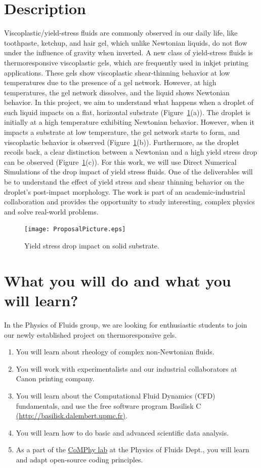 \documentclass[11pt]{article}
\begin{document}
\section*{Description}
Viscoplastic/yield-stress fluids are commonly observed in our daily life, like toothpaste, ketchup, and hair gel, which unlike Newtonian liquids, do not flow under the influence of gravity when inverted. A new class of yield-stress fluids is thermoresponsive viscoplastic gels, which are frequently used in inkjet printing applications. These gels show viscoplastic shear-thinning behavior at low temperatures due to the presence of a gel network. However, at high temperatures, the gel network dissolves, and the liquid shows Newtonian behavior. In this project, we aim to understand what happens when a droplet of such liquid impacts on a flat, horizontal substrate (Figure~\ref{Fig::Fig1}(a)). The droplet is initially at a high temperature exhibiting Newtonian behavior. However, when it impacts a substrate at low temperature, the gel network starts to form, and viscoplastic behavior is observed (Figure~\ref{Fig::Fig1}(b)). Furthermore, as the droplet recoils back, a clear distinction between a Newtonian and a high yield stress drop can be observed (Figure~\ref{Fig::Fig1}(c)). For this work, we will use Direct Numerical Simulations of the drop impact of yield stress fluids. One of the deliverables will be to understand the effect of yield stress and shear thinning behavior on the droplet's post-impact morphology. The work is part of an academic-industrial collaboration and provides the opportunity to study interesting, complex physics and solve real-world problems. 
\begin{figure}[H]
 \begin{center}
  \texttt{[image: ProposalPicture.eps]}
 \end{center}
 \caption{Yield stress drop impact on solid substrate.}
 \label{Fig::Fig1}
\end{figure}

\section*{What you will do and what you will learn?}
In the Physics of Fluids group, we are looking for enthusiastic students to join our newly established project on thermoresponsive gels. 
\begin{enumerate}
	\item You will learn about rheology of complex non-Newtonian fluids. 
	\item You will work with experimentalists and our industrial collaborators at Canon printing company.
	\item You will learn about the Computational Fluid Dynamics (CFD) fundamentals, and use the free software program Basilisk C \href{http://basilisk.dalembert.upmc.fr}{(http://basilisk.dalembert.upmc.fr)}. 
	\item You will learn how to do basic and advanced scientific data analysis. 
	\item As a part of the \href{https://comphy-lab.org}{CoMPhy lab} at the Physics of Fluids Dept., you will learn and adapt open-source coding principles. 
\end{enumerate}
\end{document}
